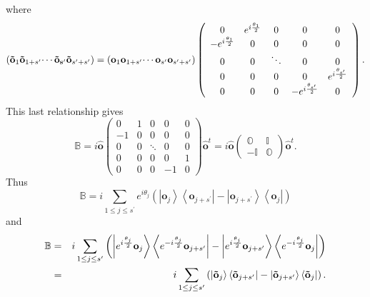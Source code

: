 \documentclass[aps,preprint]{revtex4}
\begin{document}
where 
\begin{equation}
\left( \mathbf{\tilde{o}}_{1}\mathbf{\tilde{o}}_{1+s^{\prime }}\mathbf{%
\cdots \tilde{o}}_{\mathbf{s^{\prime }}}\mathbf{\tilde{o}}_{s^{\prime
}+s^{\prime }}\right) =\left( \mathbf{o}_{1}\mathbf{o}_{1+s^{\prime }}%
\mathbf{\cdots o}_{s^{\prime }}\mathbf{o}_{s^{\prime }+s^{\prime }}\right)
\left( 
\begin{array}{ccccc}
0 & e^{i\frac{\theta _{1}}{2}} & 0 & 0 & 0 \\ 
-e^{i\frac{\theta _{1}}{2}} & 0 & 0 & 0 & 0 \\ 
0 & 0 & \ddots  & 0 & 0 \\ 
0 & 0 & 0 & 0 & e^{i\frac{\theta _{s^{\prime }}}{2}} \\ 
0 & 0 & 0 & -e^{i\frac{\theta _{s^{\prime }}}{2}} & 0%
\end{array}%
\right) .
\end{equation}%
This last relationship gives 
\begin{equation}
\mathbb{B}=i\mathbf{\hat{o}}\left( 
\begin{array}{ccccc}
0 & 1 & 0 & 0 & 0 \\ 
-1 & 0 & 0 & 0 & 0 \\ 
0 & 0 & \ddots  & 0 & 0 \\ 
0 & 0 & 0 & 0 & 1 \\ 
0 & 0 & 0 & -1 & 0%
\end{array}%
\right) \mathbf{\hat{o}}^{t}=i\mathbf{\hat{o}}\left( 
\begin{array}{cc}
\mathbb{O} & \mathbb{I} \\ 
-\mathbb{I} & \mathbb{O}%
\end{array}%
\right) \mathbf{\hat{o}}^{t}.
\end{equation}%
Thus 
\begin{equation}
\mathbb{B}=i\sum_{1\leq j\leq s^{\prime }}e^{i\theta _{j}}\left( \left\vert 
\mathbf{o}_{j}\right\rangle \left\langle \mathbf{o}_{j+s^{\prime
}}\right\vert -\left\vert \mathbf{o}_{j+s^{\prime }}\right\rangle
\left\langle \mathbf{o}_{j}\right\vert \right) 
\end{equation}%
and 
\begin{eqnarray}
\mathbb{B} &=&i\sum_{1\leq j\leq s^{\prime }}\left( \left\vert e^{i\frac{%
\theta _{j}}{2}}\mathbf{o}_{j}\right\rangle \left\langle e^{-i\frac{\theta
_{j}}{2}}\mathbf{o}_{j+s^{\prime }}\right\vert -\left\vert e^{i\frac{\theta
_{j}}{2}}\mathbf{o}_{j+s^{\prime }}\right\rangle \left\langle e^{-i\frac{%
\theta _{j}}{2}}\mathbf{o}_{j}\right\vert \right)  \\
&=&i\sum_{1\leq j\leq s^{\prime }}\left( \left\vert \mathbf{\tilde{o}}%
_{j}\right\rangle \left\langle \mathbf{\tilde{o}}_{j+s^{\prime }}\right\vert
-\left\vert \mathbf{\tilde{o}}_{j+s^{\prime }}\right\rangle \left\langle 
\mathbf{\tilde{o}}_{j}\right\vert \right) .
\end{eqnarray}%
\end{document}
